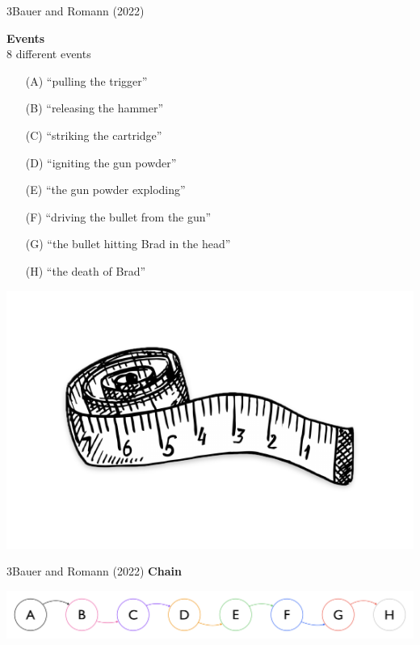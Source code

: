 \documentclass[xcolor=table,9pt,aspectratio=169]{beamer}
\begin{document}
\begin{frame}{\vspace*{10mm}3\hspace*{1em}Bauer and Romann (2022)}
\vspace*{-5mm}
\begin{multicols}{2}
\textbf{Events}\\
8 different events
\begin{itemize}
   \item[(A)] ``pulling the trigger''
   \item[(B)] ``releasing the hammer''
   \item[(C)] ``striking the cartridge''
   \item[(D)] ``igniting the gun powder''
   \item[(E)] ``the gun powder exploding''
   \item[(F)] ``driving the bullet from the gun''
   \item[(G)] ``the bullet hitting Brad in the head''
   \item[(H)] ``the death of Brad''
\end{itemize}
\vfill
\begin{center}
   \includegraphics[width=\linewidth]{figures/tape_measure.pdf}
\end{center}
\end{multicols}
\end{frame}


\begin{frame}{\vspace*{10mm}3\hspace*{1em}Bauer and Romann (2022)}
\vspace*{-5mm}
\textbf{Chain}\\
\begin{center}
   \includegraphics[width=.8\linewidth]{figures/combinations_2.pdf}
\end{center}
\end{frame}
\end{document}
